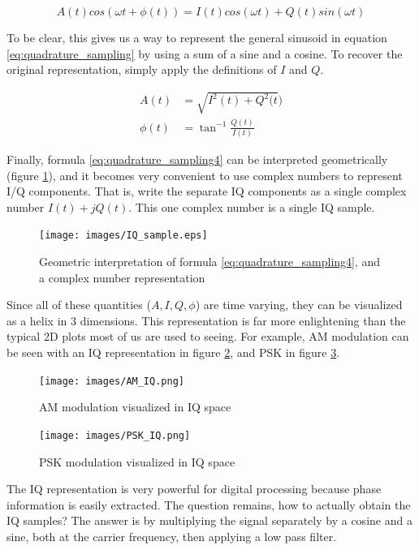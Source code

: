 \documentclass[a4paper, 12pt]{article}
\begin{document}
\begin{equation}
\label{eq:quadrature_sampling3}
A(t)cos(\omega t + \phi (t)) = I(t)cos(\omega t) + Q(t)sin(\omega t)
\end{equation}

To be clear, this gives us a way to represent the general sinusoid in equation \ref{eq:quadrature_sampling} by using a sum of a sine and a cosine.  To recover the original representation, simply apply the definitions of $I$ and $Q$.

\begin{equation}
\label{eq:quadrature_sampling4}
\begin{aligned}
A(t) &= \sqrt{I^2(t) + Q^2(t})\\
\phi(t) &= \tan^{-1}{\frac{Q(t)}{I(t)}}
\end{aligned}
\end{equation}

Finally, formula \ref{eq:quadrature_sampling4} can be interpreted geometrically (figure \ref{fig:quadrature_sampling}), and it becomes very convenient to use complex numbers to represent I/Q components.  That is, write the separate IQ components as a single complex number $I(t) + jQ(t)$.  This one complex number is a single IQ sample.

\begin{figure}[h]
\caption{Geometric interpretation of formula \ref{eq:quadrature_sampling4}, and a complex number representation}
\label{fig:quadrature_sampling}
\centering
\texttt{[image: images/IQ\_sample.eps]}
\end{figure}

Since all of these quantities ($A, I, Q, \phi$) are time varying, they can be visualized as a helix in 3 dimensions.  This representation is far more enlightening than the typical 2D plots most of us are used to seeing.  For example, AM modulation can be seen with an IQ representation in figure \ref{fig:am_iq}, and PSK in figure \ref{fig:psk_iq}.

\begin{figure}[h]
\caption{AM modulation visualized in IQ space}
\label{fig:am_iq}
\centering
\texttt{[image: images/AM\_IQ.png]}
\end{figure}

\begin{figure}[h]
\caption{PSK modulation visualized in IQ space}
\label{fig:psk_iq}
\centering
\texttt{[image: images/PSK\_IQ.png]}
\end{figure}

The IQ representation is very powerful for digital processing because phase information is easily extracted.  The question remains, how to actually obtain the IQ samples?  The answer is by multiplying the signal separately by a cosine and a sine, both at the carrier frequency, then applying a low pass filter.
\end{document}
